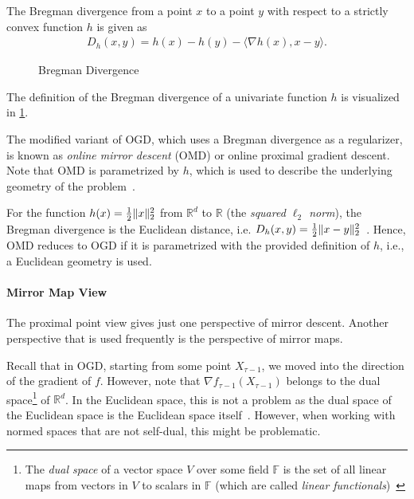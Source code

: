 \begin{definition}
\cite{Goel2018} The Bregman divergence from a point $x$ to a point $y$ with respect to a strictly convex function $h$ is given as \begin{align*}
    D_h(x,y) = h(x) - h(y) - \langle\nabla h(x), x - y\rangle.
\end{align*}
\end{definition}

\begin{figure}
    \centering
    [TODO]
    \caption{Bregman Divergence}
    \label{fig:bregman_divergence}
\end{figure}

The definition of the Bregman divergence of a univariate function $h$ is visualized in \cref{fig:bregman_divergence}.

The modified variant of OGD, which uses a Bregman divergence as a regularizer, is known as \emph{online mirror descent} (OMD) or online proximal gradient descent. Note that OMD is parametrized by $h$, which is used to describe the underlying geometry of the problem~\cite{Goel2018}.

For the function $h(x) = \frac{1}{2} \lVert x\rVert_2^2$ from $\mathbb{R}^d$ to $\mathbb{R}$ (the \emph{squared $\ell_2$ norm}), the Bregman divergence is the Euclidean distance, i.e. $D_h(x,y) = \frac{1}{2} \lVert x-y\rVert_2^2$~\cite{Goel2018}. Hence, OMD reduces to OGD if it is parametrized with the provided definition of $h$, i.e., a Euclidean geometry is used.

\paragraph{Mirror Map View} The proximal point view gives just one perspective of mirror descent. Another perspective that is used frequently is the perspective of mirror maps.

Recall that in OGD, starting from some point $X_{\tau-1}$, we moved into the direction of the gradient of $f$. However, note that $\nabla f_{\tau-1}(X_{\tau-1})$ belongs to the dual space\footnote{The \emph{dual space} of a vector space $V$ over some field $\mathbb{F}$ is the set of all linear maps from vectors in $V$ to scalars in $\mathbb{F}$ (which are called \emph{linear functionals})~\cite{Wadsley2015}} of $\mathbb{R}^d$. In the Euclidean space, this is not a problem as the dual space of the Euclidean space is the Euclidean space itself~\cite{Gupta2020}. However, when working with normed spaces that are not self-dual, this might be problematic.

